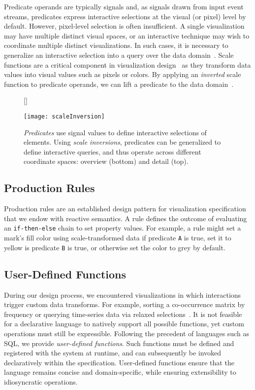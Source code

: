 Predicate operands are typically signals and, as signals drawn from input event
streams, predicates express interactive selections at the visual (or pixel)
level by default. However, pixel-level selection is often insufficient. A single
visualization may have multiple distinct visual spaces, or an interactive
technique may wish to coordinate multiple distinct visualizations. In such
cases, it is necessary to generalize an interactive selection into a query over
the data domain~\cite{heer:generalized}. Scale functions are a critical
component in visualization design~ \cite{wilkinson:grammar} as they transform
data values into visual values such as pixels or colors. By applying an
\emph{inverted} scale function to predicate operands, we can lift a predicate to
the data domain~\cite{derthick:vqe}.

\begin{figure}[h!]
  [\FBwidth]
  {\caption{\emph{Predicates} use signal values to define interactive selections
of elements. Using \emph{scale inversions}, predicates can be generalized to
define interactive queries, and thus operate across different coordinate spaces:
overview (bottom) and detail (top).}
  \label{fig:vl:scaleInversion}}
  {\texttt{[image: scaleInversion]}}
\end{figure}

\subsection{Production Rules}

Production rules are an established design pattern for visualization
specification~\cite{heer:designpatterns} that we endow with reactive semantics.
A rule defines the outcome of evaluating an \texttt{if-then-else} chain to set
property values. For example, a rule might set a mark's fill color using
scale-transformed data if predicate \texttt{A} is true, set it to yellow is
predicate \texttt{B} is true, or otherwise set the color to grey by default.

\subsection{User-Defined Functions}

During our design process, we encountered visualizations in which interactions
trigger custom data transforms. For example, sorting a co-occurrence matrix by
frequency or querying time-series data via relaxed
selections~\cite{holz:relaxed}. It is not feasible for a declarative language to
natively support all possible functions, yet custom operations must still be
expressible. Following the precedent of languages such as SQL, we provide
\emph{user-defined functions}. Such functions must be defined and registered
with the system at runtime, and can subsequently be invoked declaratively within
the specification. User-defined functions ensure that the language remains
concise and domain-specific, while ensuring extensibility to idiosyncratic
operations.

